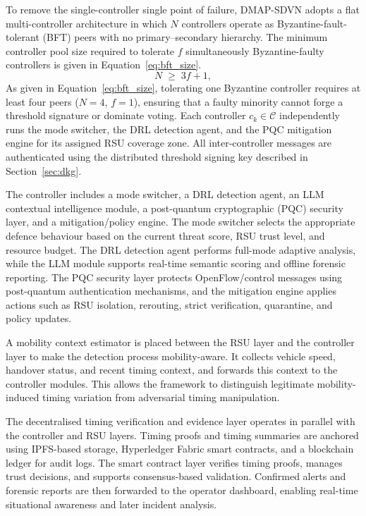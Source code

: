 To remove the single-controller single point of failure,
DMAP-SDVN adopts a flat multi-controller architecture in which
$N$ controllers operate as Byzantine-fault-tolerant (BFT) peers
with no primary--secondary hierarchy. The minimum controller
pool size required to tolerate $f$ simultaneously Byzantine-faulty
controllers is given in Equation~\eqref{eq:bft_size}.
%
\begin{equation}
  N \;\geq\; 3f + 1,
  \label{eq:bft_size}
\end{equation}
%
As given in Equation~\eqref{eq:bft_size}, tolerating one
Byzantine controller requires at least four peers ($N=4$,
$f=1$), ensuring that a faulty minority cannot forge a threshold
signature or dominate voting. Each controller $c_k \in
\mathcal{C}$ independently runs the mode switcher, the DRL
detection agent, and the PQC mitigation engine for its assigned
RSU coverage zone. All inter-controller messages are authenticated
using the distributed threshold signing key described in
Section~\ref{sec:dkg}.


The controller includes a mode switcher, a DRL detection agent, an LLM contextual intelligence module, a post-quantum cryptographic (PQC) security layer, and a mitigation/policy engine. The mode switcher selects the appropriate defence behaviour based on the current threat score, RSU trust level, and resource budget. The DRL detection agent performs full-mode adaptive analysis, while the LLM module supports real-time semantic scoring and offline forensic reporting. The PQC security layer protects OpenFlow/control messages using post-quantum authentication mechanisms, and the mitigation engine applies actions such as RSU isolation, rerouting, strict verification, quarantine, and policy updates.

A mobility context estimator is placed between the RSU layer and the controller layer to make the detection process mobility-aware. It collects vehicle speed, handover status, and recent timing context, and forwards this context to the controller modules. This allows the framework to distinguish legitimate mobility-induced timing variation from adversarial timing manipulation.

The decentralised timing verification and evidence layer operates in parallel with the controller and RSU layers. Timing proofs and timing summaries are anchored using IPFS-based storage, Hyperledger Fabric smart contracts, and a blockchain ledger for audit logs. The smart contract layer verifies timing proofs, manages trust decisions, and supports consensus-based validation. Confirmed alerts and forensic reports are then forwarded to the operator dashboard, enabling real-time situational awareness and later incident analysis.

